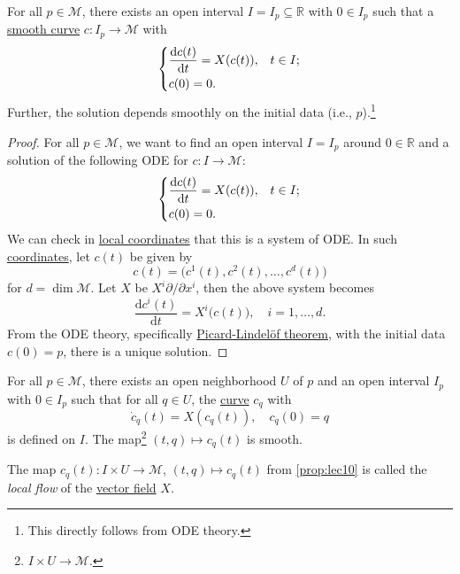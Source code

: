 \begin{proposition}
	For all \(p\in \mathcal{M} \), there exists an open interval \(I = I_p \subseteq \mathbb{R} \) with \(0\in I_p\) such that a \hyperref[def:curve]{smooth curve} \(c\colon I_p \to \mathcal{M} \) with
	\[
		\begin{dcases}
			\frac{\mathrm{d}c(t)}{\mathrm{d}t} = X(c(t)), & t\in I; \\
			c(0) = 0.
		\end{dcases}
	\]
	Further, the solution depends smoothly on the initial data (i.e., \(p\)).\footnote{This directly follows from ODE theory.}
\end{proposition}
\begin{proof}
	For all \(p\in \mathcal{M} \), we want to find an open interval \(I = I_p\) around \(0\in \mathbb{R} \) and a solution of the following ODE for \(c\colon I \to \mathcal{M} \):
	\[
		\begin{dcases}
			\frac{\mathrm{d}c(t)}{\mathrm{d}t} = X(c(t)), & t\in I; \\
			c(0) = 0.
		\end{dcases}
	\]
	We can check in \hyperref[def:coordinate-chart]{local coordinates} that this is a system of ODE. In such \hyperref[def:coordinate-chart]{coordinates}, let \(c(t)\) be given by
	\[
		c(t) = \big(c^1(t), c^2(t), \ldots , c^d(t)\big)
	\]
	for \(d = \dim \mathcal{M} \). Let \(X\) be \(X^i \partial / \partial x^i\), then the above system becomes
	\[
		\frac{\mathrm{d}c^i(t)}{\mathrm{d}t} = X^i\big(c(t)\big) ,\quad i = 1, \ldots , d.
	\]
	From the ODE theory, specifically \href{https://en.wikipedia.org/wiki/Picard%E2%80%93Lindel%C3%B6f_theorem}{Picard-Lindelöf theorem}, with the initial data \(c(0)=p\), there is a unique solution.	
\end{proof}

\begin{proposition}\label{prop:lec10}
	For all \(p\in \mathcal{M} \), there exists an open neighborhood \(U\) of \(p\) and an open interval \(I_p\) with \(0\in I_p\) such that for all \(q\in U\), the \hyperref[def:curve]{curve} \(c_q\) with
	\[
		\dot{c}_q(t) = X(c_q(t)),\quad c_q(0) = q
	\]
	is defined on \(I\). The map\footnote{\(I \times U \to \mathcal{M} \).} \((t, q) \mapsto c_q(t)\) is smooth.
\end{proposition}

\begin{center}
\end{center}

\begin{definition}\label{def:local-flow}
	The map \(c_q(t) \colon I\times U \to \mathcal{M} \), \((t, q)\mapsto c_q(t)\) from \autoref{prop:lec10} is called the \emph{local flow} of the \hyperref[def:vector-field]{vector field} \(X\).
\end{definition}

